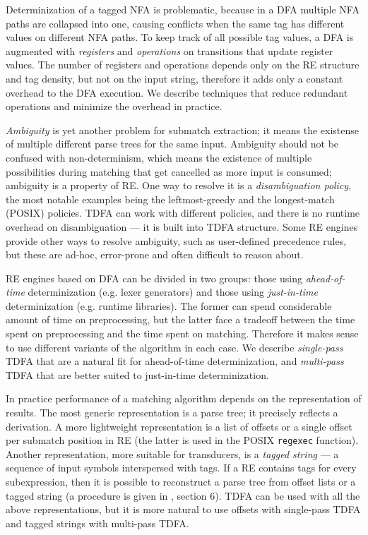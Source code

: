 \documentclass[]{article}
\begin{document}
Determinization of a tagged NFA is problematic, because in a DFA multiple NFA paths are collapsed into one,
causing conflicts when the same tag has different values on different NFA paths.
To keep track of all possible tag values, a DFA is augmented with \emph{registers}
and \emph{operations} on transitions that update register values.
The number of registers and operations depends only on the RE structure and tag density,
but not on the input string,
therefore it adds only a constant overhead to the DFA execution.
We describe techniques that reduce redundant operations and minimize the overhead in practice.
\medskip

\emph{Ambiguity} is yet another problem for submatch extraction;
it means the existense of multiple different parse trees for the same input.
Ambiguity should not be confused with non-determinism,
which means the existence of multiple possibilities during matching that get cancelled as more input is consumed;
ambiguity is a property of RE.
%
One way to resolve it is a \emph{disambiguation policy},
the most notable examples being the leftmost-greedy and the longest-match (POSIX) policies.
TDFA can work with different policies, and there is no runtime overhead on disambiguation --- it is built into TDFA structure.
Some RE engines provide other ways to resolve ambiguity, such as user-defined precedence rules,
but these are ad-hoc, error-prone and often difficult to reason about.
\medskip

RE engines based on DFA can be divided in two groups:
those using \emph{ahead-of-time} determinization (e.g. lexer generators)
and those using \emph{just-in-time} determinization (e.g. runtime libraries).
The former can spend considerable amount of time on preprocessing,
but the latter face a tradeoff between the time spent on preprocessing and the time spent on matching.
Therefore it makes sense to use different variants of the algorithm in each case.
We describe \emph{single-pass} TDFA that are a natural fit for ahead-of-time determinization,
and \emph{multi-pass} TDFA that are better suited to just-in-time determinization.
\medskip

In practice performance of a matching algorithm depends on the representation of results.
The most generic representation is a parse tree; it precisely reflects a derivation.
A more lightweight representation is a list of offsets or a single offset per submatch position in RE
(the latter is used in the POSIX \texttt{regexec} function).
Another representation, more suitable for transducers, is a \emph{tagged string} ---
a sequence of input symbols interspersed with tags.
If a RE contains tags for every subexpression,
then it is possible to reconstruct a parse tree from offset lists or a tagged string (a procedure is given in \cite{BorTro19}, section 6).
TDFA can be used with all the above representations,
but it is more natural to use offsets with single-pass TDFA
and tagged strings with multi-pass TDFA.
\medskip
\end{document}
